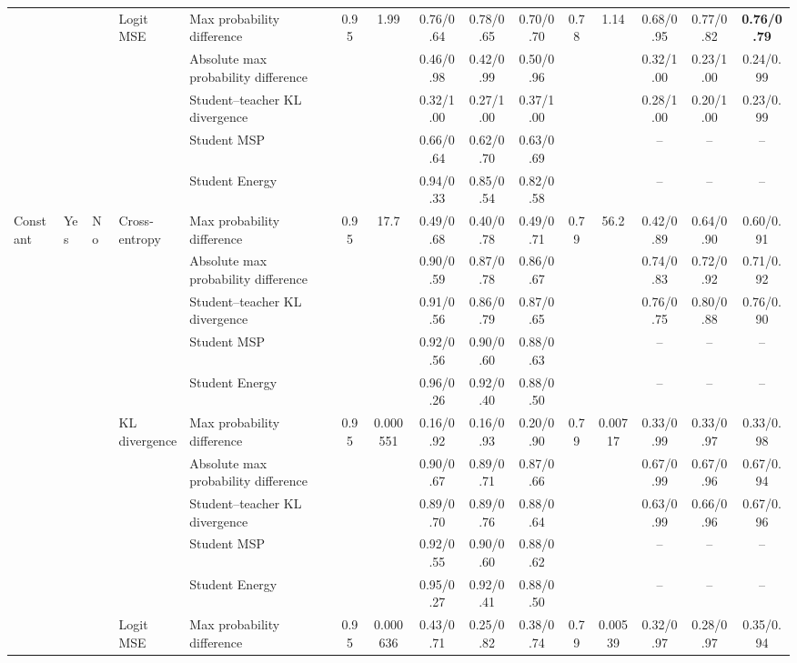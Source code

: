 \documentclass[border=2pt]{standalone}
\begin{document}
\begin{tabular}{lllllcccccccccc}
 &  &  & Logit MSE & Max probability difference & 0.95 & 1.99 & 0.76/0.64 & 0.78/0.65 & 0.70/0.70 & 0.78 & 1.14 & 0.68/0.95 & 0.77/0.82 & \textbf{0.76/0.79} \\
 &  &  &  & Absolute max probability difference &  &  & 0.46/0.98 & 0.42/0.99 & 0.50/0.96 &  &  & 0.32/1.00 & 0.23/1.00 & 0.24/0.99 \\
 &  &  &  & Student--teacher KL divergence &  &  & 0.32/1.00 & 0.27/1.00 & 0.37/1.00 &  &  & 0.28/1.00 & 0.20/1.00 & 0.23/0.99 \\
 &  &  &  & Student MSP &  &  & 0.66/0.64 & 0.62/0.70 & 0.63/0.69 &  &  & -- & -- & -- \\
 &  &  &  & Student Energy &  &  & 0.94/0.33 & 0.85/0.54 & 0.82/0.58 &  &  & -- & -- & -- \\
\addlinespace
Constant & Yes & No & Cross-entropy & Max probability difference & 0.95 & 17.7 & 0.49/0.68 & 0.40/0.78 & 0.49/0.71 & 0.79 & 56.2 & 0.42/0.89 & 0.64/0.90 & 0.60/0.91 \\
 &  &  &  & Absolute max probability difference &  &  & 0.90/0.59 & 0.87/0.78 & 0.86/0.67 &  &  & 0.74/0.83 & 0.72/0.92 & 0.71/0.92 \\
 &  &  &  & Student--teacher KL divergence &  &  & 0.91/0.56 & 0.86/0.79 & 0.87/0.65 &  &  & 0.76/0.75 & 0.80/0.88 & 0.76/0.90 \\
 &  &  &  & Student MSP &  &  & 0.92/0.56 & 0.90/0.60 & 0.88/0.63 &  &  & -- & -- & -- \\
 &  &  &  & Student Energy &  &  & 0.96/0.26 & 0.92/0.40 & 0.88/0.50 &  &  & -- & -- & -- \\
 &  &  & KL divergence & Max probability difference & 0.95 & 0.000551 & 0.16/0.92 & 0.16/0.93 & 0.20/0.90 & 0.79 & 0.00717 & 0.33/0.99 & 0.33/0.97 & 0.33/0.98 \\
 &  &  &  & Absolute max probability difference &  &  & 0.90/0.67 & 0.89/0.71 & 0.87/0.66 &  &  & 0.67/0.99 & 0.67/0.96 & 0.67/0.94 \\
 &  &  &  & Student--teacher KL divergence &  &  & 0.89/0.70 & 0.89/0.76 & 0.88/0.64 &  &  & 0.63/0.99 & 0.66/0.96 & 0.67/0.96 \\
 &  &  &  & Student MSP &  &  & 0.92/0.55 & 0.90/0.60 & 0.88/0.62 &  &  & -- & -- & -- \\
 &  &  &  & Student Energy &  &  & 0.95/0.27 & 0.92/0.41 & 0.88/0.50 &  &  & -- & -- & -- \\
 &  &  & Logit MSE & Max probability difference & 0.95 & 0.000636 & 0.43/0.71 & 0.25/0.82 & 0.38/0.74 & 0.79 & 0.00539 & 0.32/0.97 & 0.28/0.97 & 0.35/0.94 \\

\end{tabular}
\end{document}
